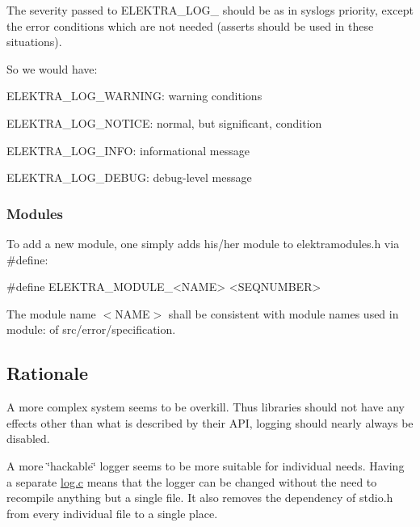The severity passed to {\ttfamily E\+L\+E\+K\+T\+R\+A\+\_\+\+L\+O\+G\+\_\+} should be as in syslog\textquotesingle{}s priority, except the error conditions which are not needed (asserts should be used in these situations).

So we would have\+:


\begin{DoxyItemize}
\item {\ttfamily E\+L\+E\+K\+T\+R\+A\+\_\+\+L\+O\+G\+\_\+\+W\+A\+R\+N\+I\+NG}\+: warning conditions
\item {\ttfamily E\+L\+E\+K\+T\+R\+A\+\_\+\+L\+O\+G\+\_\+\+N\+O\+T\+I\+CE}\+: normal, but significant, condition
\item {\ttfamily E\+L\+E\+K\+T\+R\+A\+\_\+\+L\+O\+G\+\_\+\+I\+N\+FO}\+: informational message
\item {\ttfamily E\+L\+E\+K\+T\+R\+A\+\_\+\+L\+O\+G\+\_\+\+D\+E\+B\+UG}\+: debug-\/level message
\end{DoxyItemize}

\subsubsection*{Modules}

To add a new module, one simply adds his/her module to {\ttfamily elektramodules.\+h} via {\ttfamily \#define}\+:


\begin{DoxyCode}
\textcolor{preprocessor}{#define ELEKTRA\_MODULE\_<NAME> <SEQNUMBER>}
\end{DoxyCode}


The module name {\ttfamily $<$N\+A\+ME$>$} shall be consistent with module names used in {\ttfamily module\+:} of {\ttfamily src/error/specification}.

\subsection*{Rationale}

A more complex system seems to be overkill. Thus libraries should not have any effects other than what is described by their A\+PI, logging should nearly always be disabled.

A more \char`\"{}hackable\char`\"{} logger seems to be more suitable for individual needs. Having a separate {\ttfamily \hyperlink{log_8c}{log.\+c}} means that the logger can be changed without the need to recompile anything but a single file. It also removes the dependency of {\ttfamily stdio.\+h} from every individual file to a single place.

